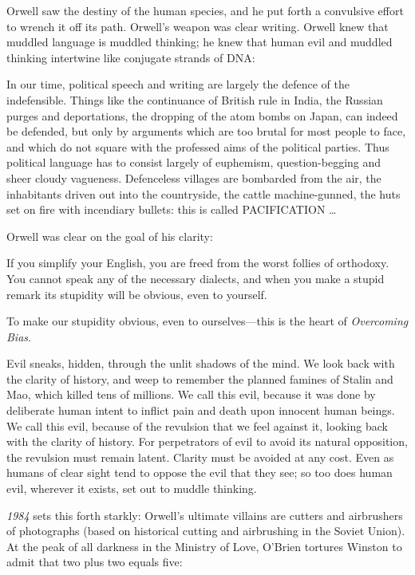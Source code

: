 {
 Orwell saw the destiny of the human species, and he put forth a
convulsive effort to wrench it off its path. Orwell's
weapon was clear writing. Orwell knew that muddled language is muddled
thinking; he knew that human evil and muddled thinking intertwine like
conjugate strands of DNA:}

{
 In our time, political speech and writing are largely the defence
of the indefensible. Things like the continuance of British rule in
India, the Russian purges and deportations, the dropping of the atom
bombs on Japan, can indeed be defended, but only by arguments which are
too brutal for most people to face, and which do not square with the
professed aims of the political parties. Thus political language has to
consist largely of euphemism, question-begging and sheer cloudy
vagueness. Defenceless villages are bombarded from the air, the
inhabitants driven out into the countryside, the cattle machine-gunned,
the huts set on fire with incendiary bullets: this is called
PACIFICATION \ldots}

{
 Orwell was clear on the goal of his clarity:}

{
 If you simplify your English, you are freed from the worst follies
of orthodoxy. You cannot speak any of the necessary dialects, and when
you make a stupid remark its stupidity will be obvious, even to
yourself.}

{
 To make our stupidity obvious, even to ourselves---this is the
heart of \textit{Overcoming Bias}.}

{
 Evil sneaks, hidden, through the unlit shadows of the mind. We
look back with the clarity of history, and weep to remember the planned
famines of Stalin and Mao, which killed tens of millions. We call this
evil, because it was done by deliberate human intent to inflict pain
and death upon innocent human beings. We call this evil, because of the
revulsion that we feel against it, looking back with the clarity of
history. For perpetrators of evil to avoid its natural opposition, the
revulsion must remain latent. Clarity must be avoided at any cost. Even
as humans of clear sight tend to oppose the evil that they see; so too
does human evil, wherever it exists, set out to muddle thinking.}

{
 \textit{1984} sets this forth starkly: Orwell's
ultimate villains are cutters and airbrushers of photographs (based on
historical cutting and airbrushing in the Soviet Union). At the peak of
all darkness in the Ministry of Love, O'Brien tortures
Winston to admit that two plus two equals five:}

